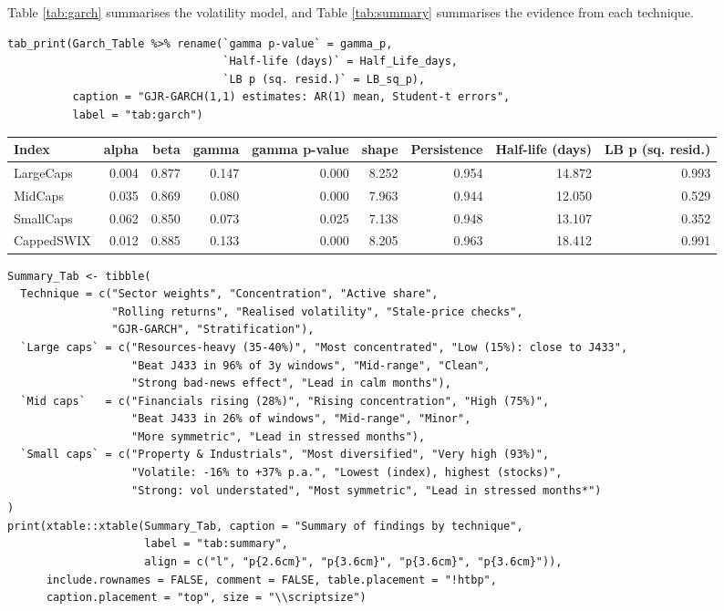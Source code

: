 \documentclass[11pt,preprint]{elsarticle}
\let\origtable\table
\let\endorigtable\endtable
\renewenvironment{table}[1][2] {
    \expandafter\origtable\expandafter[H]
} {
    \endorigtable
}
\numberwithin{equation}{section}
\numberwithin{figure}{section}
\numberwithin{table}{section}
\begin{document}
Table \ref{tab:garch} summarises the volatility model, and Table
\ref{tab:summary} summarises the evidence from each technique.

\begin{verbatim}
tab_print(Garch_Table %>% rename(`gamma p-value` = gamma_p,
                                 `Half-life (days)` = Half_Life_days,
                                 `LB p (sq. resid.)` = LB_sq_p),
          caption = "GJR-GARCH(1,1) estimates: AR(1) mean, Student-t errors",
          label = "tab:garch")
\end{verbatim}

\begin{table}[!htbp]
\centering
\caption{GJR-GARCH(1,1) estimates: AR(1) mean, Student-t errors} 
\label{tab:garch}
\begingroup\footnotesize
\begin{tabular}{lrrrrrrrr}
  \hline
Index & alpha & beta & gamma & gamma p-value & shape & Persistence & Half-life (days) & LB p (sq. resid.) \\ 
  \hline
LargeCaps & 0.004 & 0.877 & 0.147 & 0.000 & 8.252 & 0.954 & 14.872 & 0.993 \\ 
  MidCaps & 0.035 & 0.869 & 0.080 & 0.000 & 7.963 & 0.944 & 12.050 & 0.529 \\ 
  SmallCaps & 0.062 & 0.850 & 0.073 & 0.025 & 7.138 & 0.948 & 13.107 & 0.352 \\ 
  CappedSWIX & 0.012 & 0.885 & 0.133 & 0.000 & 8.205 & 0.963 & 18.412 & 0.991 \\ 
   \hline
\end{tabular}
\endgroup
\end{table}

\begin{verbatim}
Summary_Tab <- tibble(
  Technique = c("Sector weights", "Concentration", "Active share",
                "Rolling returns", "Realised volatility", "Stale-price checks",
                "GJR-GARCH", "Stratification"),
  `Large caps` = c("Resources-heavy (35-40%)", "Most concentrated", "Low (15%): close to J433",
                   "Beat J433 in 96% of 3y windows", "Mid-range", "Clean",
                   "Strong bad-news effect", "Lead in calm months"),
  `Mid caps`   = c("Financials rising (28%)", "Rising concentration", "High (75%)",
                   "Beat J433 in 26% of windows", "Mid-range", "Minor",
                   "More symmetric", "Lead in stressed months"),
  `Small caps` = c("Property & Industrials", "Most diversified", "Very high (93%)",
                   "Volatile: -16% to +37% p.a.", "Lowest (index), highest (stocks)",
                   "Strong: vol understated", "Most symmetric", "Lead in stressed months*")
)
print(xtable::xtable(Summary_Tab, caption = "Summary of findings by technique",
                     label = "tab:summary",
                     align = c("l", "p{2.6cm}", "p{3.6cm}", "p{3.6cm}", "p{3.6cm}")),
      include.rownames = FALSE, comment = FALSE, table.placement = "!htbp",
      caption.placement = "top", size = "\\scriptsize")
\end{verbatim}
\end{document}
